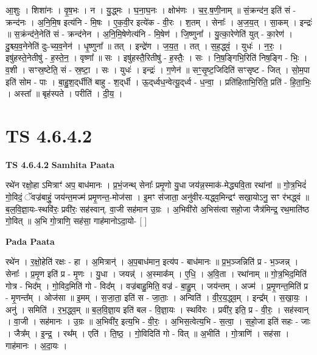 \documentclass[17pt]{extarticle}
\begin{document}
आ॒शुः । शिशा॑नः । वृ॒ष॒भः । न । यु॒द्ध्मः । घ॒ना॒घ॒नः । क्षोभ॑णः । च॒र॒.ष॒णी॒नाम् ॥ सं॒क्रन्द॑न॒ इति॑ सं - क्रन्द॑नः । अ॒नि॒मि॒ष इत्य॑नि - मि॒षः । ए॒क॒वी॒र इत्ये॑क - वी॒रः । श॒तम् । सेनाः᳚ । अ॒ज॒य॒त् । सा॒कम् । इन्द्रः॑ ॥ स॒क्रंन्द॑ने॒नेति॑ सं - क्रन्द॑नेन । अ॒नि॒मि॒षेणेत्य॑नि - मि॒षेण॑ । जि॒ष्णुना᳚ । यु॒त्का॒रेणेति॑ युत् - का॒रेण॑ । दु॒श्च्य॒व॒नेनेति॑ दुः-च्य॒व॒नेन॑ । धृ॒ष्णुना᳚ ॥ तत् । इन्द्रे॑ण । ज॒य॒त॒ । तत् । स॒ह॒द्ध्वं॒ । युधः॑ । न॒रः॒ । इषु॑हस्ते॒नेतीषु॑ - ह॒स्ते॒न॒ । वृष्णा᳚ ॥ सः । इषु॑हस्तै॒रितीषु॑ - ह॒स्तैः॒ । सः । नि॒ष॒ङ्गिभि॒रिति॑ निष॒ङ्गि - भिः॒ । व॒शी । सꣳस्र॒ष्टेति॒ सं - स्र॒ष्टा॒ । सः । युधः॑ । इन्द्रः॑ । ग॒णेन॑ ॥ सꣳ॒॒सृ॒ष्ट॒जिदिति॑ सꣳसृष्ट - जित् । सो॒म॒पा इति॑ सोम - पाः । बा॒हु॒श॒द्‌र्धीति॑ बाहु - श॒द्‌र्धी । ऊ॒द्‌र्ध्वध॒न्वेत्यू॒द्‌र्ध्व - ध॒न्वा॒ । प्रति॑हिताभि॒रिति॒ प्रति॑ - हि॒ता॒भिः॒ । अस्ता᳚ ॥ बृह॑स्पते । परीति॑ । दी॒य॒ ।  \newline




\section*{ TS 4.6.4.2 }

\textbf{TS 4.6.4.2 } \newline
\textbf{Samhita Paata} \newline

रथे॑न रक्षो॒हा ऽमित्राꣳ॑ अप॒ बाध॑मानः । प्र॒भं॒जन्थ् सेनाः᳚ प्रमृ॒णो यु॒धा जय॑न्न॒स्माक॑-मेद्ध्यवि॒ता रथा॑नां ॥ गो॒त्र॒भिदं॑ गो॒विदं॒ ॅवज्र॑बाहुं॒ जय॑न्त॒मज्म॑ प्रमृ॒णन्त॒-मोज॑सा । इ॒मꣳ स॑जाता॒ अनु॑वीर-यद्ध्व॒मिन्द्रꣳ॑ सखा॒योऽनु॒ सꣳ र॑भद्ध्वं ॥ ब॒ल॒वि॒ज्ञा॒यः-स्थवि॑रः॒ प्रवी॑रः॒ सह॑स्वान्. वा॒जी सह॑मान उ॒ग्रः । अ॒भिवी॑रो अ॒भिस॑त्वा सहो॒जा जैत्र॑मिन्द्र॒ रथ॒माति॑ष्ठ गो॒वित् ॥ अ॒भि गो॒त्राणि॒ सह॑सा॒ गाह॑मानोऽदा॒यो- [  ] \newline

\textbf{Pada Paata} \newline

रथे॑न । र॒क्षो॒हेति॑ रक्षः - हा । अ॒मित्रान्॑ । अ॒प॒बाध॑मान॒ इत्य॑प - बाध॑मानः ॥ प्र॒भ॒ञ्जन्निति॑ प्र - भ॒ञ्जन्न् । सेनाः᳚ । प्र॒मृ॒ण इति॑ प्र - मृ॒णः । यु॒धा । जयन्न्॑ । अ॒स्माक᳚म् । ए॒धि॒ । अ॒वि॒ता । रथा॑नाम् ॥ गो॒त्र॒भिद॒मिति॑ गोत्र - भिद᳚म् । गो॒विद॒मिति॑ गो - विद᳚म् । वज्र॑बाहु॒मिति॒ वज्र॑ - बा॒हु॒म् । जय॑न्तम् । अज्म॑ । प्र॒मृ॒णन्त॒मिति॑ प्र - मृ॒णन्त᳚म् । ओज॑सा ॥ इ॒मम् । स॒जा॒ता॒ इति॑ स - जा॒ताः॒ । अन्विति॑ । वी॒र॒य॒द्ध्व॒म् । इन्द्र᳚म् । स॒खा॒यः॒ । अनु॑ । समिति॑ । र॒भ॒द्ध्व॒म् ॥ ब॒ल॒वि॒ज्ञा॒य इति॑ बल - वि॒ज्ञा॒यः । स्थवि॑रः । प्रवी॑र॒ इति॒ प्र - वी॒रः॒ । सह॑स्वान् । वा॒जी । सह॑मानः । उ॒ग्रः ॥ अ॒भिवी॑र॒ इत्य॒भि - वी॒रः॒ । अ॒भिस॒त्वेत्य॒भि - स॒त्वा॒ । स॒हो॒जा इति॑ सहः - जाः । जैत्र᳚म् । इ॒न्द्र॒ । रथ᳚म् । एति॑ । ति॒ष्ठ॒ । गो॒विदिति॑ गो - वित् ॥ अ॒भीति॑ । गो॒त्राणि॑ । सह॑सा । गाह॑मानः । अ॒दा॒यः ।  \newline
\end{document}
